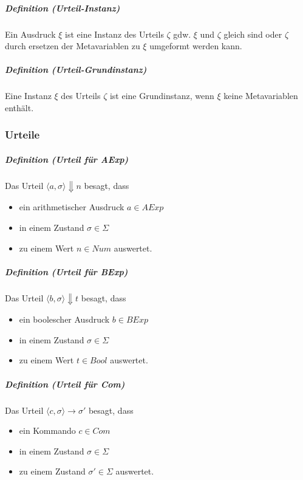 \documentclass[a4paper, 11pt, accentcolor = tud3b]{tudreport}
\newcommand{\definition}[2]{\subparagraph{Definition (#1)} #2}
\begin{document}
				    \definition{Urteil-Instanz}{Ein Ausdruck $ \xi $ ist eine Instanz des Urteils $ \zeta $ gdw. $ \xi $ und $ \zeta $ gleich sind oder $ \zeta $ durch ersetzen der Metavariablen zu $ \xi $ umgeformt werden kann.}
				    
				    \definition{Urteil-Grundinstanz}{Eine Instanz $ \xi $ des Urteils $ \zeta $ ist eine Grundinstanz, wenn $ \xi $ keine Metavariablen enthält.}
		    
			    \subsubsection{Urteile}
				    \definition{Urteil für \textit{AExp}}{
				    	Das Urteil $ \langle a, \sigma \rangle \Downarrow n $ besagt, dass
				    	\begin{itemize}
				    		\item ein arithmetischer Ausdruck $ a \in \textit{AExp} $
				    		\item in einem Zustand $ \sigma \in \Sigma $
				    		\item zu einem Wert $ n \in \textit{Num} $ auswertet.
				    	\end{itemize}
					}
					
					\definition{Urteil für \textit{BExp}}{
						Das Urteil $ \langle b, \sigma \rangle \Downarrow t $ besagt, dass
						\begin{itemize}
							\item ein boolescher Ausdruck $ b \in \textit{BExp} $
							\item in einem Zustand $ \sigma \in \Sigma $
							\item zu einem Wert $ t \in \textit{Bool} $ auswertet.
						\end{itemize}
					}
					
					\definition{Urteil für \textit{Com}}{
						Das Urteil $ \langle c, \sigma \rangle \rightarrow \sigma' $ besagt, dass
						\begin{itemize}
							\item ein Kommando $ c \in \textit{Com} $
							\item in einem Zustand $ \sigma \in \Sigma $
							\item zu einem Zustand $ \sigma' \in \Sigma $ auswertet.
						\end{itemize}
					}
		    
\end{document}
